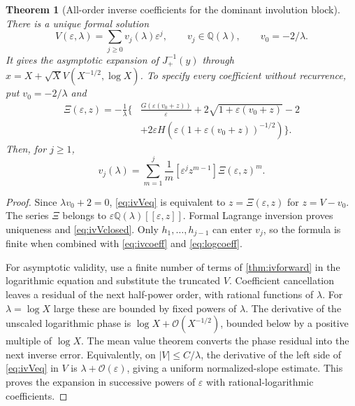 \documentclass[11pt,a4paper]{article}
\newtheorem{theorem}{Theorem}[section]
\theoremstyle{definition}
\theoremstyle{remark}
\newcommand{\QQ}{\mathbb Q}
\newcommand{\OO}{\mathcal O}
\newcommand{\coef}[1]{\left[#1\right]}
\numberwithin{equation}{section}
\begin{document}
\begin{theorem}[All-order inverse coefficients for the dominant involution block]
There is a unique formal solution
\begin{equation}
 V(\varepsilon,\lambda)=\sum_{j\ge0}v_j(\lambda)\varepsilon^j,
 \qquad v_j\in\QQ(\lambda),\qquad v_0=-2/\lambda.
 \label{eq:ivV}
\end{equation}
It gives the asymptotic expansion of $J_+^{-1}(y)$ through
$x=X+\sqrt X V(X^{-1/2},\log X)$. To specify every coefficient without recurrence, put $v_0=-2/\lambda$ and
\begin{align}
 \Xi(\varepsilon,z)=-\frac1\lambda\Bigg\{&
 \frac{G(\varepsilon(v_0+z))}{\varepsilon}
 +2\sqrt{1+\varepsilon(v_0+z)}-2\nonumber\\
 &+2\varepsilon H\!\left(\varepsilon(1+\varepsilon(v_0+z))^{-1/2}\right)\Bigg\}.
 \label{eq:ivXi}
\end{align}
Then, for $j\ge1$,
\begin{equation}
 v_j(\lambda)=\sum_{m=1}^j\frac1m
 \coef{\varepsilon^j z^{m-1}}\Xi(\varepsilon,z)^m.
 \label{eq:ivVclosed}
\end{equation}
\end{theorem}
\begin{proof}
Since $\lambda v_0+2=0$, \eqref{eq:ivVeq} is equivalent to $z=\Xi(\varepsilon,z)$ for $z=V-v_0$. The series $\Xi$ belongs to $\varepsilon\QQ(\lambda)[[\varepsilon,z]]$. Formal Lagrange inversion proves uniqueness and \eqref{eq:ivVclosed}. Only $h_1,\ldots,h_{j-1}$ can enter $v_j$, so the formula is finite when combined with \eqref{eq:ivcoeff} and \eqref{eq:logcoeff}.

For asymptotic validity, use a finite number of terms of \cref{thm:ivforward} in the logarithmic equation and substitute the truncated $V$. Coefficient cancellation leaves a residual of the next half-power order, with rational functions of $\lambda$. For $\lambda=\log X$ large these are bounded by fixed powers of $\lambda$. The derivative of the unscaled logarithmic phase is $\log X+\OO(X^{-1/2})$, bounded below by a positive multiple of $\log X$. The mean value theorem converts the phase residual into the next inverse error. Equivalently, on $|V|\le C/\lambda$, the derivative of the left side of \eqref{eq:ivVeq} in $V$ is $\lambda+\OO(\varepsilon)$, giving a uniform normalized-slope estimate. This proves the expansion in successive powers of $\varepsilon$ with rational-logarithmic coefficients.
\end{proof}
\end{document}
